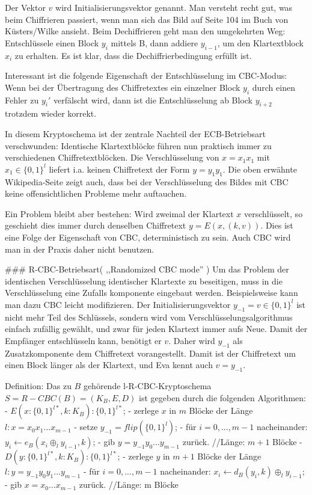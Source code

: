 \documentclass[a4paper]{article}
\begin{document}
\begin{multicols}{3}
        Der Vektor $v$ wird Initialisierungsvektor genannt. Man versteht recht gut, was beim Chiffrieren passiert, wenn man sich das Bild auf Seite 104 im Buch von Küsters/Wilke ansieht. Beim Dechiffrieren geht man den umgekehrten Weg: Entschlüssele einen Block $y_i$ mittels B, dann addiere $y_{i-1}$, um den Klartextblock $x_i$ zu erhalten. Es ist klar, dass die Dechiffrierbedingung erfüllt ist.

        Interessant ist die folgende Eigenschaft der Entschlüsselung im CBC-Modus: Wenn bei der Übertragung des Chiffretextes ein einzelner Block $y_i$ durch einen Fehler zu $y_i′$ verfälscht wird, dann ist die Entschlüsselung ab Block $y_{i+2}$ trotzdem wieder korrekt.

        In diesem Kryptoschema ist der zentrale Nachteil der ECB-Betriebsart verschwunden: Identische Klartextblöcke führen nun praktisch immer zu verschiedenen Chiffretextblöcken. Die Verschlüsselung von $x=x_1 x_1$ mit $x_1\in\{0,1\}^l$ liefert i.a. keinen Chiffretext der Form $y=y_1 y_1$. Die oben erwähnte Wikipedia-Seite zeigt auch, dass bei der Verschlüsselung des Bildes mit CBC keine offensichtlichen Probleme mehr auftauchen.

        Ein Problem bleibt aber bestehen: Wird zweimal der Klartext $x$ verschlüsselt, so geschieht dies immer durch denselben Chiffretext $y=E(x,(k,v))$. Dies ist eine Folge der Eigenschaft von CBC, deterministisch zu sein. Auch CBC wird man in der Praxis daher nicht benutzen.

        ### R-CBC-Betriebsart( ,,Randomized CBC mode'' )
        Um das Problem der identischen Verschlüsselung identischer Klartexte zu beseitigen, muss in die Verschlüsselung eine Zufalls komponente eingebaut werden. Beispielsweise kann man dazu CBC leicht modifizieren. Der Initialisierungsvektor $y_{-1}=v\in\{0,1\}^l$  ist nicht mehr Teil des Schlüssels, sondern wird vom Verschlüsselungsalgorithmus einfach zufällig gewählt, und zwar für jeden Klartext immer aufs Neue. Damit der Empfänger entschlüsseln kann, benötigt er $v$. Daher wird $y_{-1}$ als Zusatzkomponente dem Chiffretext vorangestellt. Damit ist der Chiffretext um einen Block länger als der Klartext, und Eva kennt auch $v=y_{-1}$.

        Definition: Das zu $B$ gehörende l-R-CBC-Kryptoschema $S=R-CBC(B) = (K_B,E,D)$ ist gegeben durch die folgenden Algorithmen:
        - $E(x:\{0,1\}^{l*},k:K_B) :\{0,1\}^{l*}$;
        - zerlege $x$ in $m$ Blöcke der Länge $l:x=x_0 x_1 ...x_{m-1}$
        - setze $y_{-1}= flip(\{0,1\}^l)$;
        - für $i=0,...,m-1$ nacheinander: $y_i\leftarrow e_B(x_i\oplus_l y_{i-1} ,k)$;
        - gib $y=y_{-1} y_0 ...y_{m-1}$ zurück. //Länge: $m+1$ Blöcke
        - $D(y:\{0,1\}^{l*},k:K_B) :\{0,1\}^{l*}$;
        - zerlege $y$ in $m+1$ Blöcke der Länge $l:y=y_{-1} y_0 y_1 ...y_{m-1}$
        - für $i=0,...,m-1$ nacheinander: $x_i\leftarrow d_B(y_i,k)\oplus_l y_{i-1}$;
        - gib $x=x_0 ...x_{m-1}$ zurück. //Länge: m Blöcke


\end{multicols}
\end{document}
